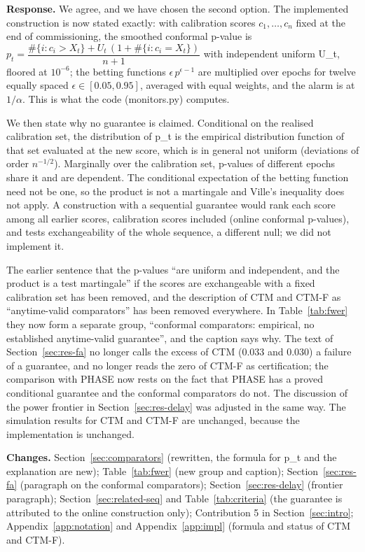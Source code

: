 \documentclass[11pt,a4paper]{article}
\newcommand{\resp}[1]{\par\noindent\textbf{Response.} #1\par}
\newcommand{\loc}[1]{\par\noindent\textbf{Changes.} #1\par}
\begin{document}
\resp{We agree, and we have chosen the second option. The implemented construction is now stated exactly: with calibration scores $c_1,\dots,c_n$ fixed at the end of commissioning, the smoothed conformal p-value is $p_t=\dfrac{\#\{i:c_i>X_t\}+U_t\,(1+\#\{i:c_i=X_t\})}{n+1}$ with independent uniform U\_t, floored at $10^{-6}$; the betting functions $\epsilon\,p^{\epsilon-1}$ are multiplied over epochs for twelve equally spaced $\epsilon\in[0.05,0.95]$, averaged with equal weights, and the alarm is at $1/\alpha$. This is what the code (monitors.py) computes.}

\par We then state why no guarantee is claimed. Conditional on the realised calibration set, the distribution of p\_t is the empirical distribution function of that set evaluated at the new score, which is in general not uniform (deviations of order $n^{-1/2}$). Marginally over the calibration set, p-values of different epochs share it and are dependent. The conditional expectation of the betting function need not be one, so the product is not a martingale and Ville's inequality does not apply. A construction with a sequential guarantee would rank each score among all earlier scores, calibration scores included (online conformal p-values), and tests exchangeability of the whole sequence, a different null; we did not implement it.

\par The earlier sentence that the p-values ``are uniform and independent, and the product is a test martingale'' if the scores are exchangeable with a fixed calibration set has been removed, and the description of CTM and CTM-F as ``anytime-valid comparators'' has been removed everywhere. In Table~\ref{tab:fwer} they now form a separate group, ``conformal comparators: empirical, no established anytime-valid guarantee'', and the caption says why. The text of Section~\ref{sec:res-fa} no longer calls the excess of CTM (0.033 and 0.030) a failure of a guarantee, and no longer reads the zero of CTM-F as certification; the comparison with PHASE now rests on the fact that PHASE has a proved conditional guarantee and the conformal comparators do not. The discussion of the power frontier in Section~\ref{sec:res-delay} was adjusted in the same way. The simulation results for CTM and CTM-F are unchanged, because the implementation is unchanged.

\loc{Section~\ref{sec:comparators} (rewritten, the formula for p\_t and the explanation are new); Table~\ref{tab:fwer} (new group and caption); Section~\ref{sec:res-fa} (paragraph on the conformal comparators); Section~\ref{sec:res-delay} (frontier paragraph); Section~\ref{sec:related-seq} and Table~\ref{tab:criteria} (the guarantee is attributed to the online construction only); Contribution 5 in Section~\ref{sec:intro}; Appendix~\ref{app:notation} and Appendix~\ref{app:impl} (formula and status of CTM and CTM-F).}
\end{document}
